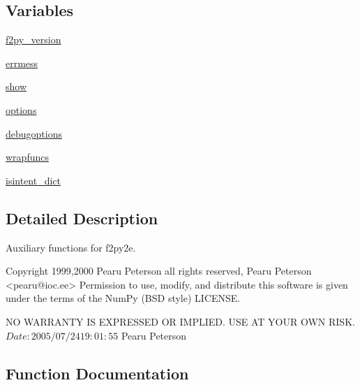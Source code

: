 \subsection*{Variables}
\begin{DoxyCompactItemize}
\item 
\hyperlink{namespacenumpy_1_1f2py_1_1auxfuncs_abf4a63887b3dba4fe31b868547e77ed9}{f2py\+\_\+version}
\item 
\hyperlink{namespacenumpy_1_1f2py_1_1auxfuncs_a25d54a2bfeb0f98c60f83d4bf7874ab2}{errmess}
\item 
\hyperlink{namespacenumpy_1_1f2py_1_1auxfuncs_afdfc36aede565e5b1cada2d030634545}{show}
\item 
\hyperlink{namespacenumpy_1_1f2py_1_1auxfuncs_aaf631ba8bbb2440bbea2c73ebb1d7efd}{options}
\item 
\hyperlink{namespacenumpy_1_1f2py_1_1auxfuncs_a2647a0c893d24da325642cca2b644867}{debugoptions}
\item 
\hyperlink{namespacenumpy_1_1f2py_1_1auxfuncs_a4ea731ab0ad45348b36983186568d8df}{wrapfuncs}
\item 
\hyperlink{namespacenumpy_1_1f2py_1_1auxfuncs_a83d31510b836bf216c8316edff92630f}{isintent\+\_\+dict}
\end{DoxyCompactItemize}


\subsection{Detailed Description}
\begin{DoxyVerb}Auxiliary functions for f2py2e.

Copyright 1999,2000 Pearu Peterson all rights reserved,
Pearu Peterson <pearu@ioc.ee>
Permission to use, modify, and distribute this software is given under the
terms of the NumPy (BSD style) LICENSE.


NO WARRANTY IS EXPRESSED OR IMPLIED.  USE AT YOUR OWN RISK.
$Date: 2005/07/24 19:01:55 $
Pearu Peterson\end{DoxyVerb}
 

\subsection{Function Documentation}
\mbox{\label{namespacenumpy_1_1f2py_1_1auxfuncs_a36b24b561287d2325984a432b46e66b4}} 
